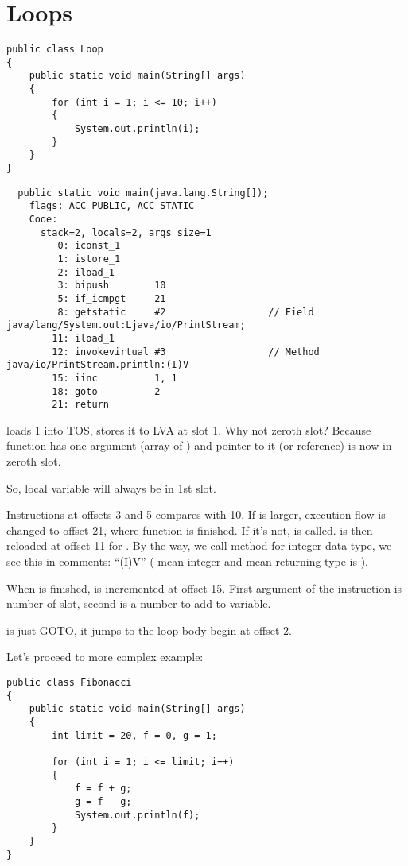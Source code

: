 \section{Loops}

\begin{lstlisting}
public class Loop
{
	public static void main(String[] args)
	{ 
		for (int i = 1; i <= 10; i++)
		{
			System.out.println(i); 
		}               
	}
}
\end{lstlisting}

\begin{lstlisting}
  public static void main(java.lang.String[]);
    flags: ACC_PUBLIC, ACC_STATIC
    Code:
      stack=2, locals=2, args_size=1
         0: iconst_1      
         1: istore_1      
         2: iload_1       
         3: bipush        10
         5: if_icmpgt     21
         8: getstatic     #2                  // Field java/lang/System.out:Ljava/io/PrintStream;
        11: iload_1       
        12: invokevirtual #3                  // Method java/io/PrintStream.println:(I)V
        15: iinc          1, 1
        18: goto          2
        21: return        
\end{lstlisting}

 loads 1 into \ac{TOS},  stores it to \ac{LVA} at slot 1.
Why not zeroth slot? Because  function has one argument (array of ) 
and pointer to it (or reference) is now in zeroth slot.

So,  local variable will always be in 1st slot.

Instructions at offsets 3 and 5 compares  with 10.
If  is larger, execution flow is changed to offset 21, where function is finished.
If it's not,  is called.  is then reloaded at offset 11 for .
By the way, we call  method for integer data type, we see this in comments: ``(I)V''
( mean integer and  mean returning type is ).

When  is finished,  is incremented at offset 15. 
First argument of the instruction is number of slot, second is a number to add to variable.

 is just GOTO, it jumps to the loop body begin at offset 2.

Let's proceed to more complex example:

\begin{lstlisting}
public class Fibonacci
{
	public static void main(String[] args)
	{ 
		int limit = 20, f = 0, g = 1;

		for (int i = 1; i <= limit; i++)
		{
			f = f + g;
			g = f - g;
			System.out.println(f); 
		}
	}
}
\end{lstlisting}

